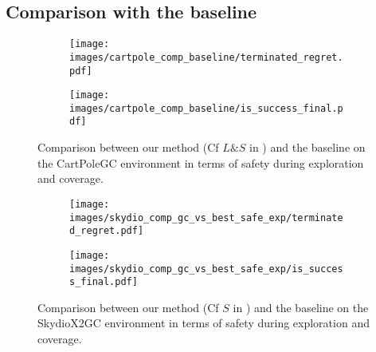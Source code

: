 \subsection{Comparison with the baseline}

\begin{figure}[ht]
    \begin{subfigure}{0.22\textwidth}  
        \centering 
        \texttt{[image: images/cartpole\_comp\_baseline/terminated\_regret.pdf]}
        \caption{}
        \label{fig:cartpole_comp_baseline/terminated_regret}
    \end{subfigure}
    \hfill
    \begin{subfigure}{0.22\textwidth}
        \centering
        \texttt{[image: images/cartpole\_comp\_baseline/is\_success\_final.pdf]}
        \caption{}
        \label{fig:cartpole_comp_baseline/is_success_final}
    \end{subfigure}
    \caption{Comparison between our method (Cf $L\&S$ in ) and the baseline on the CartPoleGC environment in terms of safety during exploration and coverage.}
    \label{fig:cartpole_comp_baseline}
\end{figure}

\begin{figure}[ht]
    \begin{subfigure}{0.22\textwidth}  
        \centering 
        \texttt{[image: images/skydio\_comp\_gc\_vs\_best\_safe\_exp/terminated\_regret.pdf]}
        \caption{}
        \label{fig:skydio_comp_gc_vs_best_safe_exp/terminated_regret}
    \end{subfigure}
    \hfill
    \begin{subfigure}{0.22\textwidth}
        \centering
        \texttt{[image: images/skydio\_comp\_gc\_vs\_best\_safe\_exp/is\_success\_final.pdf]}
        \caption{}
        \label{fig:skydio_comp_gc_vs_best_safe_exp/is_success_final}
    \end{subfigure}
    \caption{Comparison between our method (Cf $S$ in ) and the baseline on the SkydioX2GC environment in terms of safety during exploration and coverage.}
    \label{fig:skydio_comp_gc_vs_best_safe_exp}
\end{figure}

